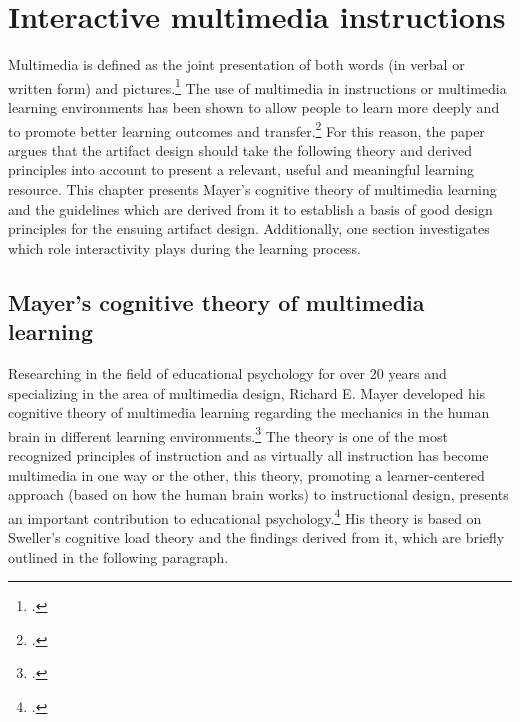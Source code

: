 \chapter{Interactive multimedia instructions} \label{chapter:Multimedia}

Multimedia is defined as the joint presentation of both words (in verbal or written form) and pictures.\footcites[Cf.][p.2]{MayerMultimediaLearning2009}[cf.][p.1205]{MarraffinoApplyingMultimediaLearning2016}[cf.][p.13]{MayerAnimationAidMultimedia2001} The use of multimedia in instructions or multimedia learning environments has been shown to allow people to learn more deeply and to promote better learning outcomes and transfer.\footcites[Cf.][p.3]{MayerMultimediaLearning2009}[cf. in addition][]{MunzerLearningmultimediapresentations2009} For this reason, the paper argues that the artifact design should take the following theory and derived principles into account to present a relevant, useful and meaningful learning resource. This chapter presents Mayer's cognitive theory of multimedia learning and the guidelines which are derived from it to establish a basis of good design principles for the ensuing artifact design. Additionally, one section investigates which role interactivity plays during the learning process. 

\section{Mayer's cognitive theory of multimedia learning} \label{sec:MayersCTML}
Researching in the field of educational psychology for over 20 years and specializing in the area of multimedia design, Richard E. Mayer developed his cognitive theory of multimedia learning regarding the mechanics in the human brain in different learning environments.\footcites[Cf.][]{MayerMultimediaLearning2009}
The theory is one of the most recognized principles of instruction and as virtually all instruction has become multimedia in one way or the other, this theory, promoting a learner-centered approach (based on how the human brain works) to instructional design, presents an important contribution to educational psychology.\footcites[Cf.][chapter 1, paragraph 3]{ClarkElearningscienceinstruction2016}[cf.][pp.4 et seq]{MayerMultimediaLearning2009}[cf. in addition][]{SordenCognitiveTheoryMultimedia2012}
His theory is based on Sweller's cognitive load theory and the findings derived from it, which are briefly outlined in the following paragraph.

